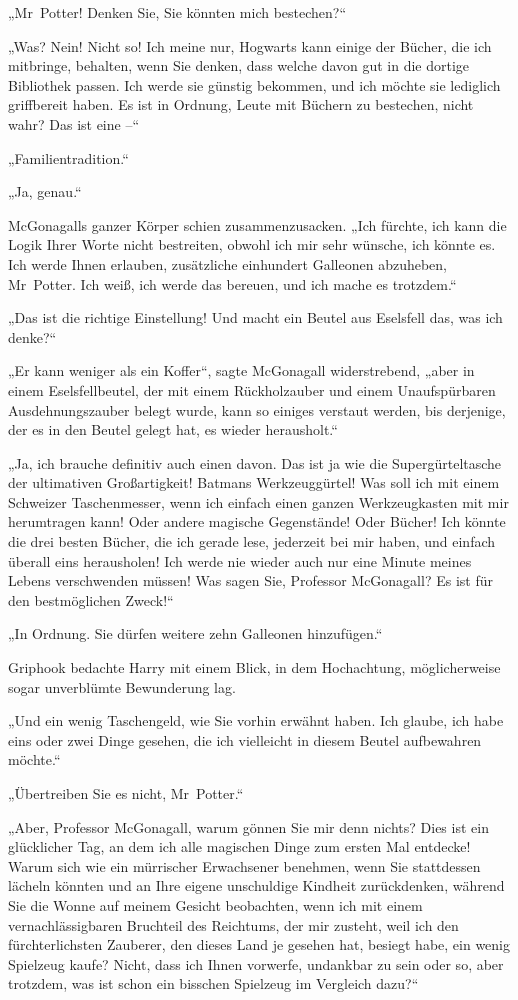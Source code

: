 „Mr~Potter! Denken Sie, Sie könnten mich bestechen?“

„Was? Nein! Nicht so! Ich meine nur, Hogwarts kann einige der Bücher, die ich mitbringe, behalten, wenn Sie denken, dass welche davon gut in die dortige Bibliothek passen. Ich werde sie günstig bekommen, und ich möchte sie lediglich griffbereit haben. Es ist in Ordnung, Leute mit Büchern zu bestechen, nicht wahr? Das ist eine –“

„Familientradition.“

„Ja, genau.“

McGonagalls ganzer Körper schien zusammenzusacken. „Ich fürchte, ich kann die Logik Ihrer Worte nicht bestreiten, obwohl ich mir sehr wünsche, ich könnte es. Ich werde Ihnen erlauben, zusätzliche einhundert Galleonen abzuheben, Mr~Potter. Ich weiß, ich werde das bereuen, und ich mache es trotzdem.“

„Das ist die richtige Einstellung! Und macht ein Beutel aus Eselsfell das, was ich denke?“ 

„Er kann weniger als ein Koffer“, sagte McGonagall widerstrebend, „aber in einem Eselsfellbeutel, der mit einem Rückholzauber und einem Unaufspürbaren Ausdehnungszauber belegt wurde, kann so einiges verstaut werden, bis derjenige, der es in den Beutel gelegt hat, es wieder herausholt.“

„Ja, ich brauche definitiv auch einen davon. Das ist ja wie die Supergürteltasche der ultimativen Großartigkeit! Batmans Werkzeuggürtel! Was soll ich mit einem Schweizer Taschenmesser, wenn ich einfach einen ganzen Werkzeugkasten mit mir herumtragen kann! Oder andere magische Gegenstände! Oder Bücher! Ich könnte die drei besten Bücher, die ich gerade lese, jederzeit bei mir haben, und einfach überall eins herausholen! Ich werde nie wieder auch nur eine Minute meines Lebens verschwenden müssen! Was sagen Sie, Professor McGonagall? Es ist für den bestmöglichen Zweck!“

„In Ordnung. Sie dürfen weitere zehn Galleonen hinzufügen.“

Griphook bedachte Harry mit einem Blick, in dem Hochachtung, möglicherweise sogar unverblümte Bewunderung lag. 

„Und ein wenig Taschengeld, wie Sie vorhin erwähnt haben. Ich glaube, ich habe eins oder zwei Dinge gesehen, die ich vielleicht in diesem Beutel aufbewahren möchte.“

„Übertreiben Sie es nicht, Mr~Potter.“

„Aber, Professor McGonagall, warum gönnen Sie mir denn nichts? Dies ist ein glücklicher Tag, an dem ich alle magischen Dinge zum ersten Mal entdecke! Warum sich wie ein mürrischer Erwachsener benehmen, wenn Sie stattdessen lächeln könnten und an Ihre eigene unschuldige Kindheit zurückdenken, während Sie die Wonne auf meinem Gesicht beobachten, wenn ich mit einem vernachlässigbaren Bruchteil des Reichtums, der mir zusteht, weil ich den fürchterlichsten Zauberer, den dieses Land je gesehen hat, besiegt habe, ein wenig Spielzeug kaufe? Nicht, dass ich Ihnen vorwerfe, undankbar zu sein oder so, aber trotzdem, was ist schon ein bisschen Spielzeug im Vergleich dazu?“

